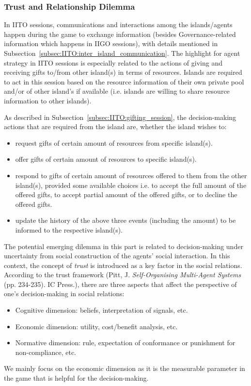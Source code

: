 \subsubsection{Trust and Relationship Dilemma} \label{subsubsec:Team6_IITO:Dilemma}
In IITO sessions, communications and interactions among the islands/agents happen during the game to exchange information (besides Governance-related information which happens in IIGO sessions), with details mentioned in Subsection~\ref{subsec:IITO:inter_island_communication}. The highlight for agent strategy in IITO sessions is especially related to the actions of giving and receiving gifts to/from other island(s) in terms of resources. Islands are required to act in this session based on the resource information of their own private pool and/or of other island's if available (i.e. islands are willing to share resource information to other islands).

As described in Subsection~\ref{subsec:IITO:gifting_session}, the decision-making actions that are required from the island are, whether the island wishes to:
\begin{itemize}
    \item request gifts of certain amount of resources from specific island(s).
    \item offer gifts of certain amount of resources to specific island(s).
    \item respond to gifts of certain amount of resources offered to them from the other island(s), provided some available choices i.e. to accept the full amount of the offered gifts, to accept partial amount of the offered gifts, or to decline the offered gifts.
    \item update the history of the above three events (including the amount) to be informed to the respective island(s).
\end{itemize}

The potential emerging dilemma in this part is related to decision-making under uncertainty from social construction of the agents' social interaction. In this context, the concept of \emph{trust} is introduced as a key factor in the social relations. According to the trust framework (Pitt, J. \textit{Self-Organising Multi-Agent Systems} (pp. 234-235). IC Press.), there are three aspects that affect the perspective of one's decision-making in social relations:
\begin{itemize}
    \item Cognitive dimension: beliefs, interpretation of signals, etc.
    \item Economic dimension: utility, cost/benefit analysis, etc.
    \item Normative dimension: rule, expectation of conformance or punishment for non-compliance, etc.
\end{itemize}
We mainly focus on the economic dimension as it is the measurable parameter in the game that is helpful for the decision-making.

